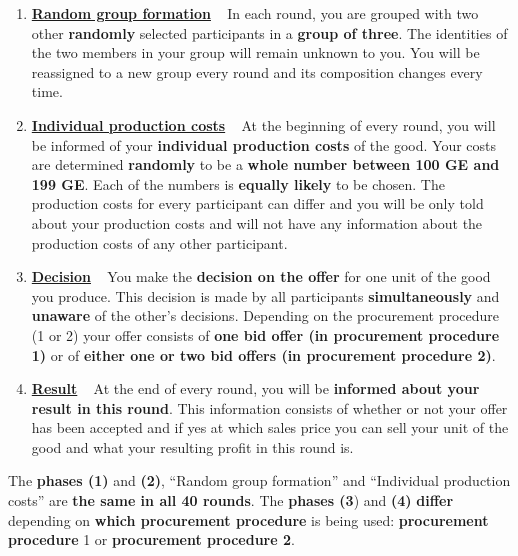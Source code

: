 \documentclass[11pt]{scrartcl}
\begin{document}
\begin{enumerate}[label=\textbf{\upshape(\arabic*\upshape)}]
	\item \textbf{\underline{Random group formation}} ~\smallbreak
		In each round, you are grouped with two other \textbf{randomly} selected participants in a \textbf{group of three}. The identities of the two members in your group will remain unknown to you. You will be reassigned to a new group every round and its composition changes every time.
	\item \textbf{\underline{Individual production costs}} ~\smallbreak
		At the beginning of every round, you will be informed of your \textbf{individual production costs} of the good. Your costs are determined \textbf{randomly} to be a \textbf{whole number between 100 GE and 199 GE}. Each of the numbers is \textbf{equally likely} to be chosen. The production costs for every participant can differ and you will be only told about your production costs and will not have any information about the production costs of any other participant.
	\item \textbf{\underline{Decision}} ~\smallbreak
		You make the \textbf{decision on the offer} for one unit of the good you produce. This decision is made by all participants \textbf{simultaneously} and \textbf{unaware} of the other’s decisions. Depending on the procurement procedure (1 or 2) your offer consists of \textbf{one bid offer (in procurement procedure 1)} or of \textbf{either one or two bid offers (in procurement procedure 2)}.
	\item \textbf{\underline{Result}}  ~\smallbreak
		At the end of every round, you will be \textbf{informed about your result in this round}. This information consists of whether or not your offer has been accepted and if yes at which sales price you can sell your unit of the good and what your resulting profit in this round is.		
\end{enumerate}

The \textbf{phases (1)} and \textbf{(2)}, \enquote{Random group formation} and \enquote{Individual production costs} are \textbf{the same in all 40 rounds}. The \textbf{phases (3}) and \textbf{(4)} \textbf{differ} depending on \textbf{which procurement procedure} is being used: \textbf{procurement procedure }1 or \textbf{procurement procedure 2}.

\end{document}
